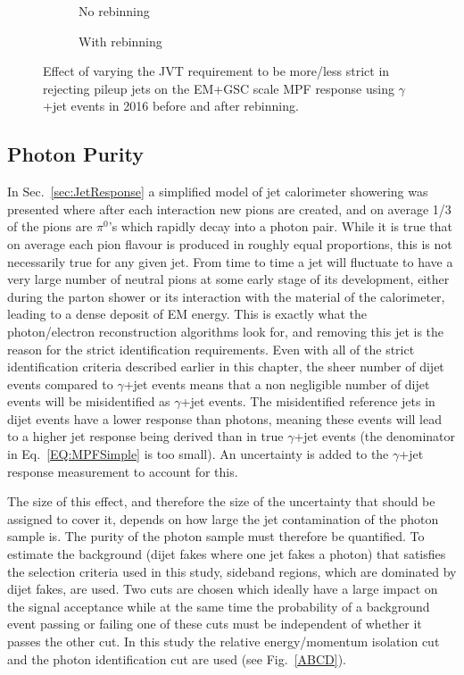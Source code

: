 \begin{figure}[!ht]
\centering
\begin{subfigure}{.5\textwidth}
\centering
{}
\caption{No rebinning}
\end{subfigure}%
\begin{subfigure}{.5\textwidth}  \centering
{}
\caption{With rebinning}
\end{subfigure}
\caption{Effect of varying the JVT requirement to be more/less strict in rejecting pileup jets on the EM+GSC scale MPF response using $\gamma$+jet events in 2016 before and after rebinning. }
\label{Fig:GJetJVTEM2016}
\end{figure}

\subsection{Photon Purity}
\label{Sec:purity}
In Sec.~\ref{sec:JetResponse} a simplified model of jet calorimeter showering was presented where after each interaction new pions are created, and on average 1/3 of the pions are $\pi^0$'s which rapidly decay into a photon pair.  
While it is true that on average each pion flavour is produced in roughly equal proportions, this is not necessarily true for any given jet.  
From time to time a jet will fluctuate to have a very large number of neutral pions at some early stage of its development, either during the parton shower or its interaction with the material of the calorimeter, leading to a dense deposit of EM energy.  
This is exactly what the photon/electron reconstruction algorithms look for, and removing this jet is the reason for the strict identification requirements.  
Even with all of the strict identification criteria described earlier in this chapter, the sheer number of dijet events compared to $\gamma$+jet events means that a non negligible number of dijet events will be misidentified as $\gamma$+jet events.  
The misidentified reference jets in dijet events have a lower response than photons, meaning these events will lead to a higher jet response being derived than in true $\gamma$+jet events (the denominator in Eq.~\ref{EQ:MPFSimple} is too small).  
An uncertainty is added to the $\gamma$+jet response measurement to account for this.  

The size of this effect, and therefore the size of the uncertainty that should be assigned to cover it, depends on how large the jet contamination of the photon sample is.  
The purity of the photon sample must therefore be quantified.  
To estimate the background (dijet fakes where one jet fakes a photon) that  satisfies the selection criteria used in this study, sideband regions, which are dominated by dijet fakes, are used.  
Two cuts are chosen which ideally have a large impact on the signal acceptance while at the same time the probability of a background event passing or failing one of these cuts must be independent of whether it passes the other cut.  
In this study the relative energy/momentum isolation cut and the photon identification cut are used (see Fig.~\ref{ABCD}).  

